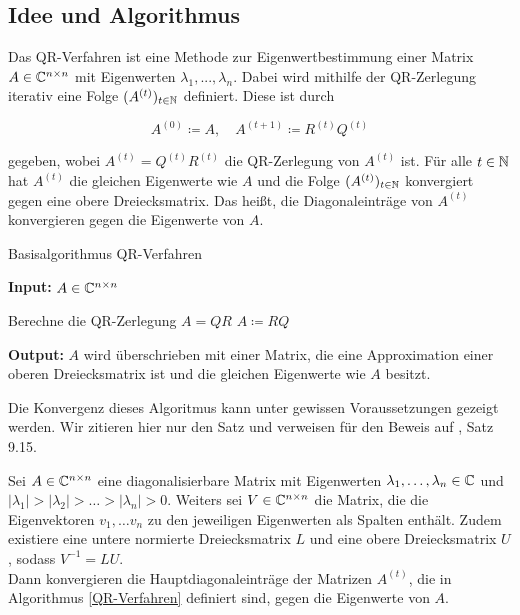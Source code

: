 \documentclass{article}
\begin{document}
\begin{theorem}
\subsection{Idee und Algorithmus}

Das QR-Verfahren ist eine Methode zur Eigenwertbestimmung einer Matrix $A \in \mathbb{C}^{n \times n}$ mit Eigenwerten $\lambda_1, ..., \lambda_n$. Dabei wird mithilfe der QR-Zerlegung iterativ eine Folge $(A^{(t)})_{t \in \mathbb{N}}$ definiert. Diese ist durch

\begin{equation}
	A^{(0)} \coloneqq A, \quad A^{(t+1)} \coloneqq R^{(t)}Q^{(t)}
\end{equation}

gegeben, wobei $A^{(t)} = Q^{(t)} R^{(t)}$ die QR-Zerlegung von $A^{(t)}$ ist.
Für alle $t\in \mathbb{N}$ hat $A^{(t)}$ die gleichen Eigenwerte wie $A$ und die Folge $(A^{(t)})_{t \in \mathbb{N}}$ konvergiert gegen eine obere Dreiecksmatrix. Das heißt, die Diagonaleinträge von $A^{(t)}$ konvergieren gegen die Eigenwerte von $A$.

\renewcommand{\algorithmicrequire}{\textbf{Input:}}
\renewcommand{\algorithmicensure}{\textbf{Output:}}

\begin{algorithm}

	\caption{Basisalgorithmus QR-Verfahren}
	\label{QR-Verfahren}
	\algorithmicrequire{ $A \in \mathbb{C}^{n\times n}$}
	\begin{algorithmic}[1]
		\State Berechne die QR-Zerlegung $A = QR$
		\State $A \coloneqq RQ$
		\EndWhile
	\end{algorithmic}
	\algorithmicensure{ $A$ wird überschrieben mit einer Matrix, die eine Approximation einer oberen Dreiecksmatrix ist und die gleichen Eigenwerte wie $A$ besitzt.}
\end{algorithm}


Die Konvergenz dieses Algoritmus kann unter gewissen Voraussetzungen gezeigt werden. Wir zitieren hier nur den Satz und verweisen für den Beweis auf \cite{Num}, Satz 9.15.

\begin{theorem}
	\label{Konv_QR}
	Sei $A \in \mathbb{C}^{n\times n}$ eine diagonalisierbare Matrix mit Eigenwerten $\lambda_1,\dots,\lambda_n \in \mathbb{C}$ und $|\lambda_1| > |\lambda_2| > \dots > |\lambda_n| > 0$. Weiters sei $V \in \mathbb{C}^{n \times n}$ die Matrix, die die Eigenvektoren $v_1,\dots v_n$ zu den jeweiligen Eigenwerten als Spalten enthält. Zudem existiere eine untere normierte Dreiecksmatrix $L$ und eine obere Dreiecksmatrix $U$, sodass $V^{-1} = LU$.\\
	Dann konvergieren die Hauptdiagonaleinträge der Matrizen $A^{(t)}$, die in Algorithmus \ref{QR-Verfahren} definiert sind, gegen die Eigenwerte von $A$.
\end{theorem}



\end{theorem}
\end{document}

